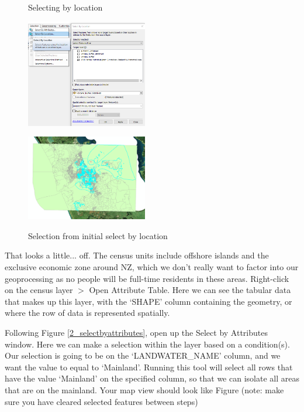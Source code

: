 \documentclass{article}
\begin{document}
\begin{figure}[h]
  \centering
  \begin{minipage}[b]{0.4\textwidth}
    \centering
    \caption{Selecting by location}
    \includegraphics[width=200px]{images/part2/selectbylocation.PNG}
    \label{2_selectbylocation}
  \end{minipage}
  \hfill
  \begin{minipage}[b]{0.4\textwidth}
    \centering
    \caption{Selection from initial select by location}
    \includegraphics[width=200px]{images/part2/selection_all.PNG}
    \label{2_selection_all}
  \end{minipage}
\end{figure}

That looks a little... off. The census units include offshore islands and the exclusive economic zone around NZ, which we don't really want to factor into our geoprocessing as no people will be full-time residents in these areas. Right-click on the census layer $>$ Open Attribute Table. Here we can see the tabular data that makes up this layer, with the `SHAPE' column containing the geometry, or where the row of data is represented spatially. 
\pagebreak

Following Figure \ref{2_selectbyattributes}, open up the Select by Attributes window. Here we can make a selection within the layer based on a condition(s). Our selection is going to be on the `LANDWATER\_NAME' column, and we want the value to equal to `Mainland'. Running this tool will select all rows that have the value `Mainland' on the specified column, so that we can isolate all areas that are on the mainland. Your map view should look like Figure  (note: make sure you have cleared selected features between steps)
\end{document}
